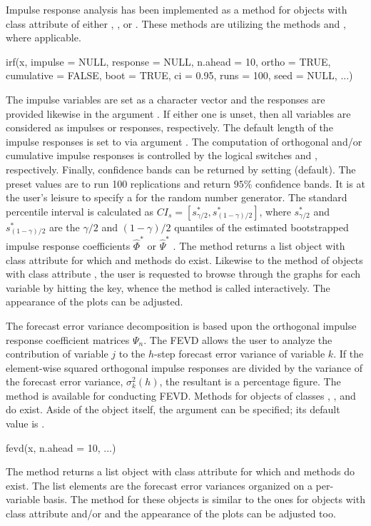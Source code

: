 \documentclass[nojss]{jss}
\begin{document}
Impulse response analysis has been implemented as a method for objects
with class attribute of either , ,  or
. These methods are utilizing the methods  and
, where applicable. 
\begin{CodeInput}
irf(x, impulse = NULL, response = NULL, n.ahead = 10, ortho = TRUE, 
  cumulative = FALSE, boot = TRUE, ci = 0.95, runs = 100, seed = NULL, ...)
\end{CodeInput}  
The impulse variables are set as a character vector  and
the responses are provided likewise in the argument
. If either one is unset, then all variables are
considered as impulses or responses, respectively. The default length
of the impulse responses is set to  via argument
. The computation of orthogonal and/or cumulative
impulse responses is controlled by the logical switches 
and , respectively. Finally, confidence bands can be
returned by setting  (default). The preset values
are to run 100 replications and return $95$\% confidence bands. It is at
the user's leisure to specify a  for the random number
generator. The standard percentile interval is calculated as $CI_s =
[s_{\gamma/2}^*, s_{(1-\gamma)/2}^*]$, where $s_{\gamma/2}^*$ and
$s_{(1-\gamma)/2}^*$ are the $\gamma/2$ and $(1-\gamma)/2$ quantiles 
of the estimated bootstrapped impulse response coefficients
$\hat{\Phi}^*$ or $\hat{\Psi}^*$ \citep[see][]{EFR1993}. The  method
returns a list object with class attribute  for which
 and  methods do exist. Likewise to the
 method of objects with class attribute , the
user is requested to browse through the graphs for each variable by
hitting the  key, whence the method is called
interactively. The appearance of the plots can be adjusted.

The forecast error variance decomposition is based upon the
orthogonal impulse response coefficient matrices $\Psi_{n}$. The
FEVD allows the user to analyze the contribution of variable $j$ to
the $h$-step forecast error variance of variable $k$. If the
element-wise squared orthogonal impulse responses are divided by the
variance of the forecast error variance, $\sigma_k^2(h)$, the
resultant is a percentage figure. The  method is available
for conducting FEVD. Methods for objects of classes ,
,  and  do exist. Aside of the object
itself, the argument  can be specified; its default
value is .   
\begin{CodeInput}
fevd(x, n.ahead = 10, ...)  
\end{CodeInput}  
The method returns a list object with class attribute 
for which  and  methods do exist. The list
elements are the forecast error variances organized on a per-variable
basis. The  method for these objects is similar to the ones
for objects with class attribute  and/or 
and the appearance of the plots can be adjusted too.
\end{document}

